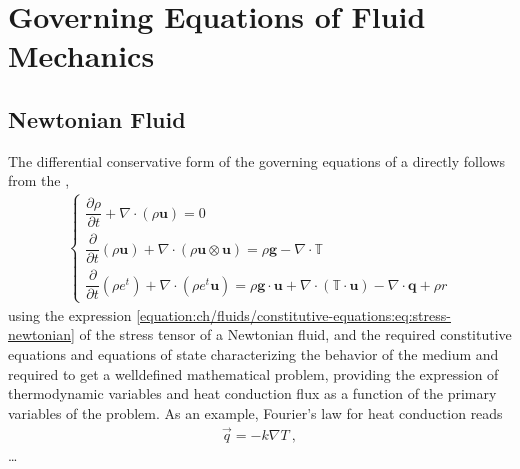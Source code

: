 \documentclass[letterpaper,10pt,english]{jupyterBook}
\begin{document}
\sphinxstepscope


\chapter{Governing Equations of Fluid Mechanics}
\label{\detokenize{ch/fluids/governing-equations:governing-equations-of-fluid-mechanics}}\label{\detokenize{ch/fluids/governing-equations:fluid-mechanics-governing-equations}}\label{\detokenize{ch/fluids/governing-equations::doc}}

\section{Newtonian Fluid}
\label{\detokenize{ch/fluids/governing-equations:newtonian-fluid}}
\sphinxAtStartPar
The differential conservative form of the governing equations of a {\hyperref[\detokenize{ch/fluids/constitutive-equations:fluid-mechanics-constutive-equations-newtonian}]{}} directly follows from the {\hyperref[\detokenize{ch/continuum/principles-differential:continuum-principles-differential}]{}},
\begin{equation*}
\begin{split}\begin{cases}
  \dfrac{\partial \rho }{\partial t} + \nabla \cdot \left( \rho \mathbf{u} \right) = 0 \\
  \dfrac{\partial }{\partial t} \left( \rho \mathbf{u} \right) +  \nabla \cdot \left( \rho \mathbf{u} \otimes \mathbf{u} \right) = \rho \mathbf{g} - \nabla \cdot \mathbb{T} \\
  \dfrac{\partial}{\partial t}  \left( \rho e^t \right) + \nabla \cdot \left( \rho e^t \mathbf{u} \right) = \rho \mathbf{g} \cdot \mathbf{u} + \nabla \cdot \left( \mathbb{T} \cdot \mathbf{u} \right) - \nabla \cdot \mathbf{q} + \rho r
\end{cases}\end{split}
\end{equation*}
\sphinxAtStartPar
using the expression \eqref{equation:ch/fluids/constitutive-equations:eq:stress-newtonian} of the stress tensor of a Newtonian fluid, and the required constitutive equations and equations of state characterizing the behavior of the medium and required to get a well\sphinxhyphen{}defined mathematical problem, providing the expression of thermodynamic variables and heat conduction flux as a function of the primary variables of the problem. As an example, Fourier’s law for heat conduction reads
\begin{equation*}
\begin{split}\vec{q} = - k \nabla T \ ,\end{split}
\end{equation*}
\sphinxAtStartPar
…
\end{document}
